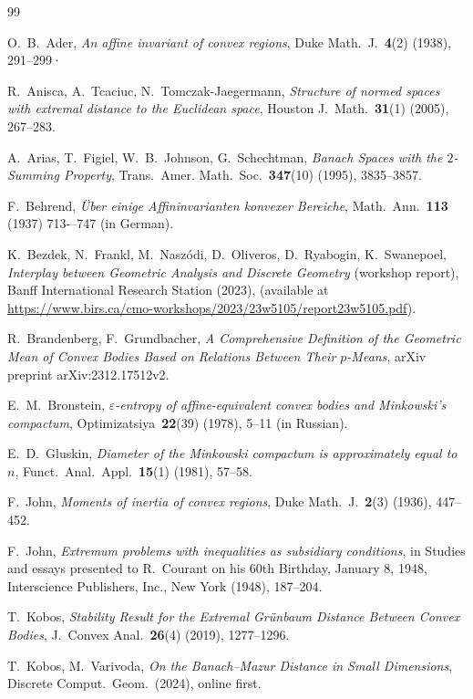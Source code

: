\documentclass[12pt,a4paper]{article}
\theoremstyle{definition}
\begin{document}
\begin{thebibliography}{99}

 O.~B.~Ader, \emph{An affine invariant of convex regions}, Duke Math.~J.~\textbf{4}(2) (1938), 291--299·

 R.~Anisca, A.~Tcaciuc, N.~Tomczak-Jaegermann, \emph{Structure of normed spaces with extremal distance to the Euclidean space}, Houston J.~Math.~\textbf{31}(1) (2005), 267--283.

 A.~Arias, T.~Figiel, W.~B.~Johnson, G.~Schechtman, \emph{Banach Spaces with the $2$-Summing Property}, Trans.~Amer. Math.~Soc.~\textbf{347}(10) (1995), 3835--3857.

 F.~Behrend, \emph{\"Uber einige Affininvarianten konvexer Bereiche}, Math.~Ann.~\textbf{113} (1937) 713-–747 (in German).

 K.~Bezdek, N.~Frankl, M.~Nasz\'{o}di, D.~Oliveros, D.~Ryabogin, K.~Swanepoel, \emph{Interplay between Geometric Analysis and Discrete Geometry} (workshop report), Banff International Research Station (2023), (available at \url{https://www.birs.ca/cmo-workshops/2023/23w5105/report23w5105.pdf}).

 R.~Brandenberg, F.~Grundbacher, \emph{A Comprehensive Definition of the Geometric Mean of Convex Bodies Based on Relations Between Their $p$-Means}, arXiv preprint arXiv:2312.17512v2.

 E.~M.~Bronstein, \emph{$\varepsilon$-entropy of affine-equivalent convex bodies and Minkowski's compactum}, Optimizatsiya~\textbf{22}(39) (1978), 5--11 (in Russian).

 E.~D.~Gluskin, \emph{Diameter of the Minkowski compactum is approximately equal to $n$}, Funct.~Anal.~Appl.~\textbf{15}(1) (1981), 57--58.

 F.~John, \emph{Moments of inertia of convex regions}, Duke Math.~J.~\textbf{2}(3) (1936), 447--452.

 F.~John, \emph{Extremum problems with inequalities as subsidiary conditions}, in Studies and essays presented to R.~Courant on his 60th Birthday, January 8, 1948, Interscience Publishers, Inc., New York (1948), 187--204.

 T.~Kobos, \emph{Stability Result for the Extremal Gr\"unbaum Distance Between Convex Bodies}, J.~Convex Anal.~\textbf{26}(4) (2019), 1277--1296.

 T.~Kobos, M.~Varivoda, \emph{On the Banach–Mazur Distance in Small Dimensions}, Discrete Comput.~Geom.~(2024), online first.


\end{thebibliography}
\end{document}
